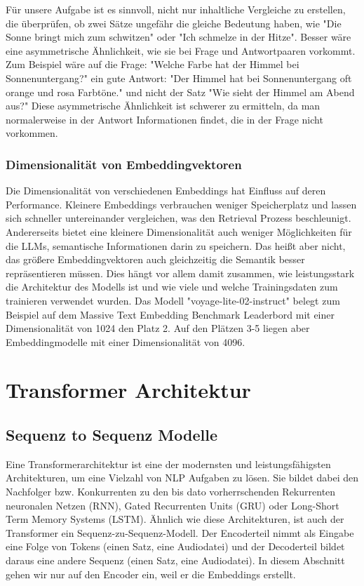 Für unsere Aufgabe ist es sinnvoll, nicht nur inhaltliche Vergleiche zu erstellen, die überprüfen, ob zwei Sätze ungefähr die gleiche Bedeutung haben, wie "Die Sonne bringt mich zum schwitzen" oder "Ich schmelze in der Hitze".
Besser wäre eine asymmetrische Ähnlichkeit, wie sie bei Frage und Antwortpaaren vorkommt.
Zum Beispiel wäre auf die Frage: "Welche Farbe hat der Himmel bei Sonnenuntergang?" ein gute Antwort: "Der Himmel hat bei Sonnenuntergang oft orange und rosa Farbtöne."  und nicht der Satz "Wie sieht der Himmel am Abend aus?"
Diese asymmetrische Ähnlichkeit ist schwerer zu ermitteln, da man normalerweise in der Antwort Informationen findet, die in der Frage nicht vorkommen.

\subsubsection{Dimensionalität von Embeddingvektoren}

Die Dimensionalität von verschiedenen Embeddings hat Einfluss auf deren Performance.
Kleinere Embeddings verbrauchen weniger Speicherplatz und lassen sich schneller untereinander vergleichen, was den Retrieval Prozess beschleunigt.
Andererseits bietet eine kleinere Dimensionalität auch weniger Möglichkeiten für die LLMs, semantische Informationen darin zu speichern.
Das heißt aber nicht, das größere Embeddingvektoren auch gleichzeitig die Semantik besser repräsentieren müssen.
Dies hängt vor allem damit zusammen, wie leistungsstark die Architektur des Modells ist und wie viele und welche Trainingsdaten zum trainieren verwendet wurden.
Das Modell "voyage-lite-02-instruct" belegt zum Beispiel auf dem Massive Text Embedding Benchmark Leaderbord mit einer Dimensionalität von 1024 den Platz 2.
Auf den Plätzen 3-5 liegen aber Embeddingmodelle mit einer Dimensionalität von 4096.


\section{Transformer Architektur}

\subsection{Sequenz to Sequenz Modelle}

Eine Transformerarchitektur ist eine der modernsten und leistungsfähigsten Architekturen, um eine Vielzahl von  NLP Aufgaben zu lösen. 
Sie bildet dabei den Nachfolger bzw. Konkurrenten zu den bis dato vorherrschenden Rekurrenten neuronalen Netzen (RNN), Gated Recurrenten Units (GRU) oder Long-Short Term Memory Systems (LSTM). 
Ähnlich wie diese Architekturen, ist auch der Transformer ein Sequenz-zu-Sequenz-Modell. 
Der Encoderteil nimmt als Eingabe eine Folge von Tokens (einen Satz, eine Audiodatei) und der Decoderteil bildet daraus eine andere Sequenz (einen Satz, eine Audiodatei). 
In diesem Abschnitt gehen wir nur auf den Encoder ein, weil er die Embeddings erstellt.

